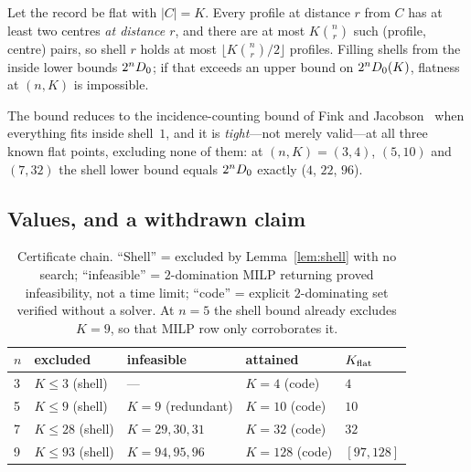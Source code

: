 \begin{lemma}
\label{lem:shell}
Let the record be flat with $|C| = K$. Every profile at distance $r$ from $C$ has
at least two centres \emph{at distance $r$}, and there are at most
$K\binom{n}{r}$ such (profile, centre) pairs, so shell $r$ holds at most
$\lfloor K\binom{n}{r}/2 \rfloor$ profiles. Filling shells from the inside lower
bounds $2^n D_0$; if that exceeds an upper bound on $2^nD_0(K)$, flatness
at $(n,K)$ is impossible.
\end{lemma}

The bound reduces to the incidence-counting bound of Fink and
Jacobson~\cite{finkjacobson1985} when everything fits inside shell~$1$, and it is
\emph{tight}---not merely valid---at all three known flat points, excluding none
of them: at $(n,K) = (3,4)$, $(5,10)$ and $(7,32)$ the shell lower bound equals
$2^nD_0$ exactly ($4$, $22$, $96$).

\subsection{Values, and a withdrawn claim}

\begin{table}[t]
\centering
\caption{Certificate chain. ``Shell'' = excluded by Lemma~\ref{lem:shell} with no
search; ``infeasible'' = $2$-domination MILP returning proved infeasibility, not
a time limit; ``code'' = explicit $2$-dominating set verified without a solver.
At $n=5$ the shell bound already excludes $K=9$, so that MILP row only
corroborates it.}
\label{tab:certificates}
\small
\begin{tabular}{@{}lllll@{}}
\toprule
$n$ & excluded & infeasible & attained & $K_{\mathrm{flat}}$ \\
\midrule
3 & $K \le 3$ (shell)  & ---                 & $K=4$ (code)   & $4$ \\
5 & $K \le 9$ (shell)  & $K = 9$ (redundant) & $K=10$ (code)  & $10$ \\
7 & $K \le 28$ (shell) & $K = 29,30,31$      & $K=32$ (code)  & $32$ \\
9 & $K \le 93$ (shell) & $K = 94,95,96$      & $K=128$ (code) & $[97,128]$ \\
\bottomrule
\end{tabular}
\end{table}

